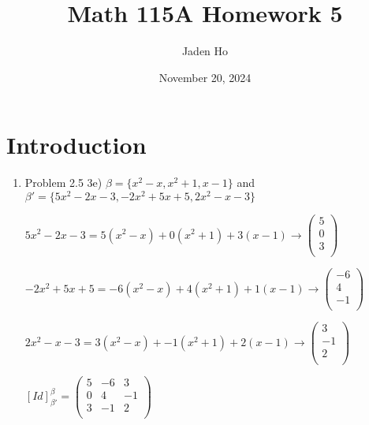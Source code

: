 \documentclass[12pt]{article}
\title{Math 115A Homework 5}
\author{Jaden Ho}
\date{November 20, 2024}
\begin{document}
\maketitle
\section{Introduction}


\begin{enumerate}
    \item Problem 2.5 3e) 
    $\beta = \{x^2-x, x^2+1, x-1 \}$ and $\beta' = \{5x^2-2x -3, -2x^2+5x+5, 2x^2-x-3 \}$
    
    $5x^2 -2x - 3 = 5(x^2 - x) + 0(x^2 + 1) + 3(x-1) \xrightarrow{} \begin{pmatrix}
        5 \\
        0 \\
        3 \\
    \end{pmatrix}$

    $-2x^2+5x+5 = -6(x^2 - x) + 4(x^2 + 1) + 1(x-1) \xrightarrow{} \begin{pmatrix}
        -6 \\
        4 \\
        -1 \\
    \end{pmatrix}$

    $2x^2-x-3 = 3(x^2 - x) + -1(x^2 + 1) + 2(x-1) \xrightarrow{} \begin{pmatrix}
        3 \\
        -1 \\
        2 \\
    \end{pmatrix}$

    $[Id]_{\beta'}^{\beta} = \begin{pmatrix}
        5 & -6 & 3 \\
        0 & 4 & -1 \\
        3 & -1 & 2 \\
    \end{pmatrix}$
    

\end{enumerate}
\end{document}
